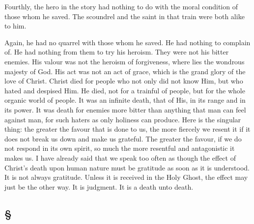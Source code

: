 \documentclass[draft]{ptfdoc}
\begin{document}
Fourthly, the hero in the story had nothing 
to do with the moral condition of those whom 
he saved. The scoundrel and the saint in that 
train were both alike to him. 

Again, he had no quarrel with those whom he 
saved. He had nothing to complain of. He had 
nothing from them to try his heroism. They 
were not his bitter enemies. His valour was 
not the heroism of forgiveness, where lies the 
wondrous majesty of God. His act was not 
an act of grace, which is the grand glory of 
the love of Christ. Christ died for people who 
not only did not know Him, but who hated and 
despised Him. He died, not for a trainful of 
people, but for the whole organic world of
people. It was an infinite death, that of His, 
in its range and in its power. It was death 
for enemies more bitter than anything that 
man can feel against man, for such haters as 
only holiness can produce. Here is the singular 
thing: the greater the favour that is done to 
us, the more fiercely we resent it if it does not 
break us down and make us grateful. The 
greater the favour, if we do not respond in its 
own spirit, so much the more resentful and 
antagonistic it makes us. I have already said 
that we speak too often as though the effect 
of Christ's death upon human nature must be 
gratitude as soon as it is understood. It is 
not always gratitude. Unless it is received in 
the Holy Ghost, the effect may just be the 
other way. It is judgment. It is a death unto 
death. 

\subsection*{ \S }
\end{document}
